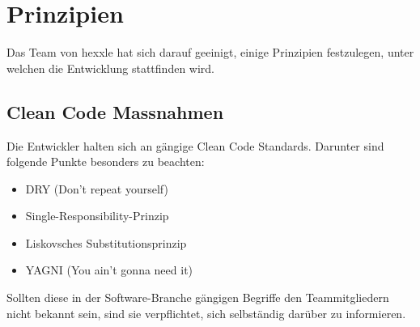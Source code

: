 \documentclass[../main.tex]{subfiles}
\begin{document}
    \section{Prinzipien}
    \label{section:Prinzipien}
    \par Das Team von \gls{hexxle} hat sich darauf geeinigt, einige Prinzipien festzulegen, unter welchen die Entwicklung stattfinden wird.
    
    \subsection{Clean Code Massnahmen}
    \label{section:CleanCodeMassnahmen}
    \par Die Entwickler halten sich an gängige Clean Code Standards. Darunter sind folgende Punkte besonders zu beachten:
    \begin{itemize}
    	\item DRY (Don't repeat yourself)
    	\item Single-Responsibility-Prinzip
    	\item Liskovsches Substitutionsprinzip
    	\item YAGNI (You ain't gonna need it)
    \end{itemize}
    \par Sollten diese in der Software-Branche gängigen Begriffe den Teammitgliedern nicht bekannt sein, sind sie verpflichtet, sich selbständig darüber zu informieren.
    
\end{document}
